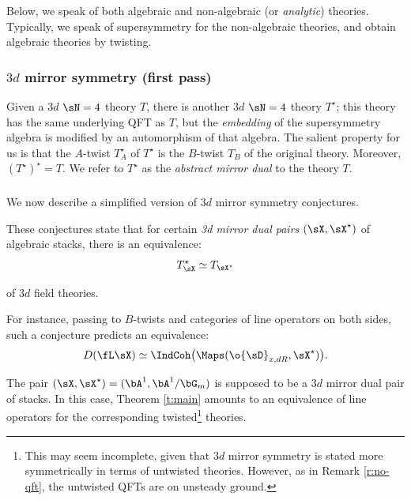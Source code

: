 \subsubsection{} Below, we speak of both algebraic and non-algebraic (or \emph{analytic})
theories. Typically, we speak of supersymmetry for the non-algebraic theories,
and obtain algebraic theories by twisting.

\subsubsection{$3d$ mirror symmetry (first pass)}

Given a $3d$ $\sN = 4$ theory $T$, there is another $3d$ $\sN = 4$
theory $T^{\star}$; this theory has the same underlying QFT as $T$, but the
\emph{embedding} of the supersymmetry algebra is modified by an automorphism
of that algebra. The salient property for us is that the $A$-twist
$T_A^{\star}$ of $T^{\star}$ is the $B$-twist $T_B$ of the original theory.
Moreover, $(T^{\star})^{\star} = T$. We refer to $T^{\star}$ as the
\emph{abstract mirror dual} to the theory $T$.

\subsubsection{}

We now describe a simplified version of $3d$ mirror symmetry conjectures.

These conjectures state that for certain \emph{3d mirror dual pairs}
$(\sX,\sX^{\star})$ of algebraic stacks, there is
an equivalence:
%
\[
T_{\sX}^{\star} \simeq T_{\sX^{\star}}
\]

 of $3d$ field theories.

For instance, passing to $B$-twists and categories of line operators on both sides,
such a conjecture predicts an equivalence:
%
\[
D(\fL\sX) \simeq \IndCoh\big(\Maps(\o{\sD}_{x,dR},\sX^{\star})\big).
\]

\begin{example}
\notready\label{e:mirror-tate-ungauged}

The pair $(\sX,\sX^{\star}) = (\bA^1,\bA^1/\bG_m)$ is supposed to be a $3d$ mirror
dual pair of stacks. In this case, Theorem \ref{t:main} amounts to
an equivalence of line operators for the corresponding twisted\footnote{This
may seem incomplete, given that $3d$ mirror symmetry is stated more symmetrically
in terms of untwisted theories. However, as in Remark \ref{r:no-qft},
the untwisted QFTs are on unsteady ground.}
theories.

\end{example}

